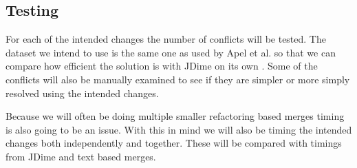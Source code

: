 \documentclass[12pt]{CRPITStyle}
\renewcommand{\cite}{\citep}
\begin{document}
\subsection{Testing}

For each of the intended changes the number of conflicts will be tested. The dataset we intend to use is the same one as used by Apel et al. so that we can compare how efficient the solution is with JDime on its own \cite{Apel2011}. Some of the conflicts will also be manually examined to see if they are simpler or more simply resolved using the intended changes. 

Because we will often be doing multiple smaller refactoring based merges timing is also going to be an issue. With this in mind we will also be timing the intended changes both independently and together. These will be compared with timings from JDime and text based merges.



\end{document}
